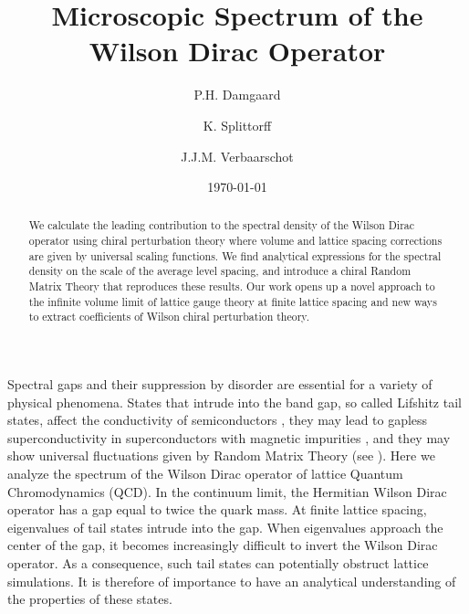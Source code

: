 \documentclass[aps,prl,twocolumn,superscriptaddress,preprintnumbers,floatfix,nofootinbib]{revtex4}
\begin{document}
\newcommand{\be}{\begin{eqnarray}}
\newcommand{\ee}{\end{eqnarray}}
\newcommand\del{\partial}
\newcommand{\nn}{\nonumber } 
\newcommand{\tK}{Z_{n=1}}
\newcommand{\re}{\mathrm{Re}}
\newcommand{\im}{\mathrm{Im}}
\newcommand{\Str}{\rm Str}
\newcommand{\bmat}{\left ( \begin{array}{cc} 
}
\newcommand{\emat}{\end{array} \right )}
\newcommand{\hm}{\hat{m}}
\newcommand{\hz}{\hat{z}}
\newcommand{\hx}{\hat{x}}
\newcommand{\ha}{\hat{a}}
 

\title{Microscopic Spectrum of the Wilson Dirac Operator} 

\author{P.H. Damgaard}
\author{K. Splittorff}
\author{J.J.M. Verbaarschot}

\date   {\today}

\begin  {abstract}
We calculate the leading contribution to the spectral density of the
Wilson Dirac operator using chiral perturbation theory
where volume and lattice spacing corrections are given by universal
scaling functions. We find analytical expressions for
the spectral density on the scale of the average level spacing, 
and introduce a chiral Random
Matrix Theory that reproduces these results. Our work opens up a
novel approach to the infinite volume limit of lattice
gauge theory at finite lattice spacing and new ways to extract
coefficients of Wilson chiral perturbation theory. 
\end {abstract}

\maketitle


Spectral gaps and their suppression by disorder are essential for a variety
of physical phenomena. States that intrude into the band gap, so
called Lifshitz tail states, affect the  conductivity of semiconductors
\cite{lifshitz}, they may lead to gapless superconductivity in
 superconductors with  magnetic impurities  \cite{Simons}, and they  
may show universal fluctuations given by Random
Matrix Theory (see \cite{beenrev}). Here we analyze the spectrum of 
the Wilson Dirac operator of lattice Quantum Chromodynamics (QCD). 
In the continuum limit, the Hermitian
Wilson Dirac operator has a gap equal to twice the quark mass.
At finite lattice spacing, eigenvalues of tail states intrude into the gap. 
When eigenvalues approach the center of the gap, it
becomes increasingly difficult to invert
the Wilson Dirac operator. As a consequence, such tail states can 
potentially obstruct lattice simulations. It is
therefore of
importance to have an
analytical understanding of the properties of these states.
\end{document}
